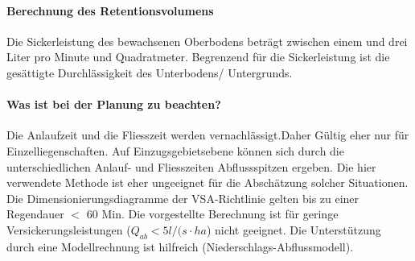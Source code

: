 \documentclass[9pt, openright=false]{scrartcl}
\begin{document}
\paragraph{Berechnung des Retentionsvolumens} Die Sickerleistung des bewachsenen Oberbodens beträgt zwischen einem und drei Liter pro Minute und Quadratmeter. Begrenzend für die Sickerleistung ist die gesättigte Durchlässigkeit des Unterbodens/ Untergrunds. 
\paragraph{Was ist bei der Planung zu beachten?}Die Anlaufzeit und die Fliesszeit werden vernachlässigt.Daher Gültig eher nur für Einzelliegenschaften. Auf Einzugsgebietsebene können sich durch die unterschiedlichen Anlauf- und Fliesszeiten Abflussspitzen ergeben. Die hier verwendete Methode ist eher ungeeignet für die Abschätzung solcher Situationen. Die Dimensionierungsdiagramme der VSA-Richtlinie gelten bis zu einer Regendauer $<$ 60 Min. Die vorgestellte Berechnung ist für geringe Versickerungsleistungen ($Q_{ab} < 5 l/(s\cdot ha$) nicht geeignet. Die Unterstützung durch eine Modellrechnung ist hilfreich (Niederschlags-Abflussmodell).\clearpage
\end{document}

